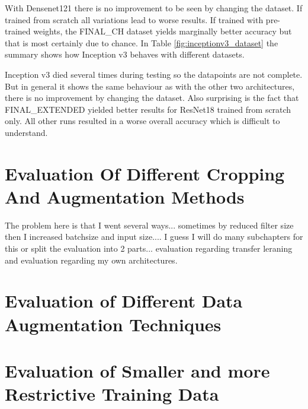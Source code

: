 With Densenet121 there is no improvement to be seen by changing the dataset. If trained from scratch all variations lead to worse results. If trained with pre-trained weights, the FINAL\_CH dataset yields marginally better accuracy but that is most certainly due to chance. In Table \ref{fig:inceptionv3_dataset} the summary shows how Inception v3 behaves with different datasets.

\begin{table}[h] \centering
{}
\caption{Dataset variations with Inception v3. The first group shows how the datasets performed when trained from scratch whereas the second group shows how the datasets performed with pre-training. FINAL\_C\_B died for the non-pre-trained twice. Only one datapoint used.}
\label{tbl:inceptionv3_dataset}
\end{table}

Inception v3 died several times during testing so the datapoints are not complete. But in general it shows the same behaviour as with the other two architectures, there is no improvement by changing the dataset. Also surprising is the fact that FINAL\_EXTENDED yielded better results for ResNet18 trained from scratch only. All other runs resulted in a worse overall accuracy which is difficult to understand.

\section{Evaluation Of Different Cropping And Augmentation Methods}

The problem here is that I went several ways... sometimes by reduced filter size then I increased batchsize and input size.... I guess I will do many subchapters for this or split the evaluation into 2 parts... evaluation regarding transfer leraning and evaluation regarding my own architectures.

\section{Evaluation of Different Data Augmentation Techniques}

\section{Evaluation of Smaller and more Restrictive Training Data}